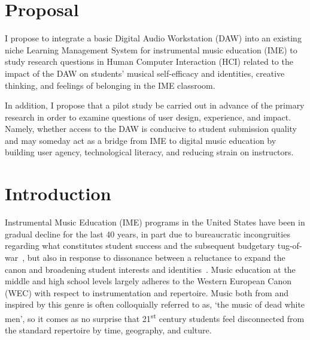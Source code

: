 \documentclass[manuscript,screen,review]{acmart}
\begin{document}
\section*{Proposal}
I propose to integrate a basic Digital Audio Workstation (DAW) into an existing niche Learning Management System for instrumental music education (IME) to study research questions in Human Computer Interaction (HCI) related to the impact of the DAW on students' musical self-efficacy and identities, creative thinking, and feelings of belonging in the IME classroom.

In addition, I propose that a pilot study be carried out in advance of the primary research in order to examine questions of user design, experience, and impact. Namely, whether access to the DAW is conducive to student submission quality and may someday act as a bridge from IME to digital music education by building user agency, technological literacy, and reducing strain on instructors.  

\pagebreak

\section{Introduction} 
Instrumental Music Education (IME) programs in the United States have been in gradual decline for the last 40 years, in part due to bureaucratic incongruities regarding what constitutes student success and the subsequent budgetary tug-of-war~\cite{Lehman20}, but also in response to dissonance between a reluctance to expand the canon and broadening student interests and identities~\cite{Vasil23}. Music education at the middle and high school levels largely adheres to the Western European Canon (WEC) with respect to instrumentation and repertoire.
Music both from and inspired by this genre is often colloquially referred to as, `the music of dead white men', so it comes as no surprise that 21\textsuperscript{st} century students feel disconnected from the standard repertoire by time, geography, and culture.
\end{document}
